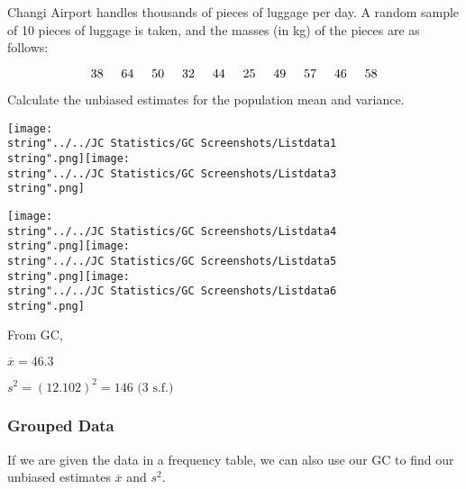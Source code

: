 \documentclass[11pt,a4paper]{book}
\begin{document}
\begin{example}

Changi Airport handles thousands of pieces of luggage per day. A random
sample of 10 pieces of luggage is taken, and the masses (in kg) of
the pieces are as follows:

\[
38\hspace{0.5cm}64\hspace{0.5cm}50\hspace{0.5cm}32\hspace{0.5cm}44\hspace{0.5cm}25\hspace{0.5cm}49\hspace{0.5cm}57\hspace{0.5cm}46\hspace{0.5cm}58
\]

Calculate the unbiased estimates for the population mean and variance.

\Solution

\texttt{[image: \\string"../../JC Statistics/GC Screenshots/Listdata1\\string".png]}\hspace{1cm}\texttt{[image: \\string"../../JC Statistics/GC Screenshots/Listdata3\\string".png]}

\texttt{[image: \\string"../../JC Statistics/GC Screenshots/Listdata4\\string".png]}\hspace{1cm}\texttt{[image: \\string"../../JC Statistics/GC Screenshots/Listdata5\\string".png]}\hspace{1cm}\texttt{[image: \\string"../../JC Statistics/GC Screenshots/Listdata6\\string".png]}

From GC,

$\overline{x}=46.3$

$s^{2}=\left(12.102\right)^{2}=146\text{ (3 s.f.)}$

\end{example}

\subsubsection{Grouped Data}

If we are given the data in a frequency table, we can also use our
GC to find our unbiased estimates $\overline{x}$ and $s^{2}$.
\end{document}
